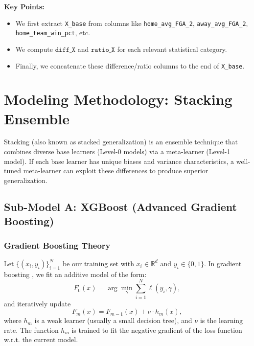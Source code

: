 \documentclass[12pt]{article}
\begin{document}
\noindent
\textbf{Key Points:}
\begin{itemize}
    \item We first extract \texttt{X\_base} from columns like \texttt{home\_avg\_FGA\_2}, \texttt{away\_avg\_FGA\_2}, \texttt{home\_team\_win\_pct}, etc.
    \item We compute \(\texttt{diff\_X}\) and \(\texttt{ratio\_X}\) for each relevant statistical category.
    \item Finally, we concatenate these difference/ratio columns to the end of \texttt{X\_base}.
\end{itemize}

\section{Modeling Methodology: Stacking Ensemble}
Stacking (also known as stacked generalization) is an ensemble technique that combines diverse base learners (Level-0 models) via a meta-learner (Level-1 model). If each base learner has unique biases and variance characteristics, a well-tuned meta-learner can exploit these differences to produce superior generalization.

\subsection{Sub-Model A: XGBoost (Advanced Gradient Boosting)}

\subsubsection{Gradient Boosting Theory}
Let \(\{(x_i, y_i)\}_{i=1}^N\) be our training set with \(x_i \in \mathbb{R}^d\) and \(y_i \in \{0,1\}\). In gradient boosting \cite{friedman2001greedy}, we fit an additive model of the form:
\[
F_0(x) = \arg\min_\gamma \sum_{i=1}^N \ell(y_i, \gamma),
\]
and iteratively update
\[
F_m(x) = F_{m-1}(x) + \nu \cdot h_m(x),
\]
where \(h_m\) is a weak learner (usually a small decision tree), and \(\nu\) is the learning rate. The function \(h_m\) is trained to fit the negative gradient of the loss function w.r.t. the current model.
\end{document}
